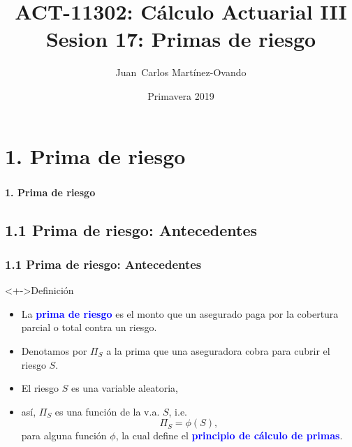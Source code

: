 \documentclass[cjk,t,compress]{beamer}
\title[C\'alculo Actuarial III]
{	ACT-11302: C\'alculo Actuarial III\\
	{\large Sesion 17: Primas de riesgo}
}
\author[Mart\'inez-Ovando]{
{	\footnotesize
	\textcolor{MyDarkGreen}{Juan~Carlos Mart\'inez-Ovando}}
}
\institute[ITAM]
{	\textcolor{MyDarkGrey}{
	ITAM}
}
\date[ ] %
{	\scriptsize
	\textcolor{MyDarkGrey}{Primavera 2019}
}
\begin{document}
\sffamily
\begin{frame}[fragile]
	\frametitle{}
	\titlepage
\end{frame}

%
%
\section{1. Prima de riesgo}
\begin{frame}[fragile]
	\frametitle{}
	\vspace{5.5cm}
	\begin{flushright}
		\textcolor{MyDarkBlue}{\Large \bf 1. Prima de riesgo}
	\end{flushright}
\end{frame}

%
%
\subsection{1.1 Prima de riesgo: Antecedentes}
\begin{frame}[fragile]
	\frametitle{1.1 Prima de riesgo: Antecedentes}
	\scriptsize  	
		
		\vspace{0.4cm}
		\begin{block}<+->{Definici\'on}
		\vspace{0.3cm}
		\begin{itemize}
		 \item La \textcolor{blue}{\bf prima de riesgo} es el monto que un asegurado paga por la cobertura parcial o total contra un riesgo.
		
		 \item Denotamos por $\Pi_S$ a la prima que una aseguradora cobra para cubrir el riesgo $S$.
		 \item El riesgo $S$ es una variable aleatoria,
		 
		 \item[] as\'i, $\Pi_S$ es una funci\'on de la v.a. $S$, i.e.
		\begin{equation}
			\Pi_S=\phi(S),
			\nonumber
		\end{equation}
		para alguna funci\'on $\phi$, la cual define el \textcolor{blue}{\bf principio de c\'alculo de primas}.
		\end{itemize}
		\end{block}  		
				
\end{frame}
\end{document}
